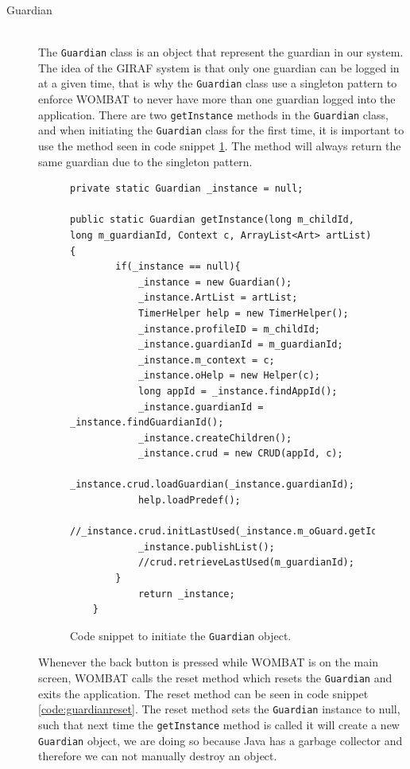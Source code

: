 \begin{description}
  \item[Guardian] \hfill \\
  The \texttt{Guardian} class is an object that represent the guardian in our system. The idea of the GIRAF system is that only one guardian can be logged in at a given time, that is why the \texttt{Guardian} class use a singleton pattern to enforce WOMBAT to never have more than one guardian logged into the application. There are two \texttt{getInstance} methods in the \texttt{Guardian} class, and when initiating the \texttt{Guardian} class for the first time, it is important to use the method seen in code snippet \ref{code:guardianinit}. The method will always return the same guardian due to the singleton pattern.
	
	\begin{figure}[H]
\begin{lstlisting}
private static Guardian _instance = null;

public static Guardian getInstance(long m_childId, long m_guardianId, Context c, ArrayList<Art> artList){
		if(_instance == null){
			_instance = new Guardian();
			_instance.ArtList = artList;
			TimerHelper help = new TimerHelper();
			_instance.profileID = m_childId;
			_instance.guardianId = m_guardianId;
			_instance.m_context = c;
			_instance.oHelp = new Helper(c);
			long appId = _instance.findAppId();
			_instance.guardianId = _instance.findGuardianId();
			_instance.createChildren();
			_instance.crud = new CRUD(appId, c);
			_instance.crud.loadGuardian(_instance.guardianId);
			help.loadPredef();
			//_instance.crud.initLastUsed(_instance.m_oGuard.getId());
			_instance.publishList();			
			//crud.retrieveLastUsed(m_guardianId);
		}
			return _instance;
	}
\end{lstlisting}
\caption{Code snippet to initiate the \texttt{Guardian} object.}%
\label{code:guardianinit}%
\end{figure}

Whenever the back button is pressed while WOMBAT is on the main screen, WOMBAT calls the reset method which resets the \texttt{Guardian} and exits the application. The reset method can be seen in code snippet \ref{code:guardianreset}. The reset method sets the \texttt{Guardian} instance to null, such that next time the \texttt{getInstance} method is called it will create a new \texttt{Guardian} object, we are doing so because Java has a garbage collector and therefore we can not manually destroy an object.
	

\end{description}
